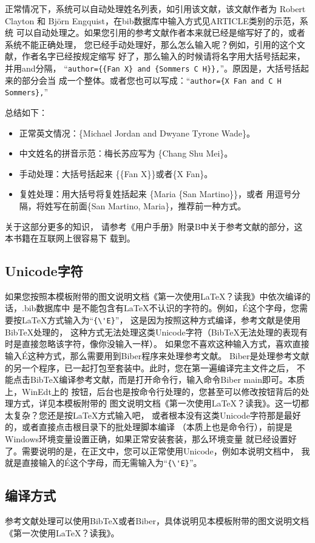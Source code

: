 正常情况下，系统可以自动处理姓名列表，如引用该文献，该文献作者为%
Robert Clayton 和 Bj\"orn Engquist，在bib数据库中输入方式见ARTICLE类别的示范，系统%
可以自动处理之。如果您引用的参考文献作者本来就已经是缩写好了的，或者系统不能正确处理，%
您已经手动处理好，那么怎么输入呢？例如，引用的这个文献，作者名字已经按规定缩写%
好了，那么输入的时候请将名字用大括号括起来，并用and分隔，%
“\verb"author={{Fan X} and {Sommers C H}},"”。原因是，大括号括起来的部分会当
成一个整体。或者您也可以写成：“\verb"author={X Fan and C H Sommers},"”

总结如下：
\begin{itemize}
\itemsep=0pt \parskip=0pt
  \item 正常英文情况：\{Michael Jordan and Dwyane Tyrone Wade\}。
  \item 中文姓名的拼音示范：梅长苏应写为 \{Chang Shu Mei\}。
  \item 手动处理：大括号括起来 \{\{Fan X\}\}或者\{X Fan\}。
  \item 复姓处理：用大括号将复姓括起来 \{Maria \{San Martino\}\}，或者%
    用逗号分隔，将姓写在前面\{San Martino, Maria\}，推荐前一种方式。
\end{itemize}

关于这部分更多的知识，%
请参考《\LaTeXe 用户手册》附录B中关于参考文献的部分，这本书籍在互联网上很容易下%
载到。

\subsection{Unicode字符}
如果您按照本模板附带的图文说明文档《第一次使用LaTeX？读我》中依次编译的话，.bib数据库中%
是不能包含有\LaTeX 不认识的字符的。例如，É这个字母，您需要按\LaTeX 方式输入为“\verb"{\'E}"”，%
这是因为按照这种方式编译，参考文献是使用BibTeX处理的，%
这种方式无法处理这类Unicode字符（BibTeX无法处理的表现有时是直接忽略该字符，像你没输入一样）。%
如果您不喜欢这种输入方式，喜欢直接输入É这种方式，那么需要用到Biber程序来处理参考文献。%
Biber是处理参考文献的另一个程序，已一起打包至\CTeX 套装中。此时，您在第一遍编译完主文件之后，%
不能点击BibTeX编译参考文献，而是打开命令行，输入命令Biber main即可。本质上，WinEdt上的%
按钮，后台也是按命令行处理的，您甚至可以修改按钮背后的处理方式，详见本模板附带的%
图文说明文档《第一次使用LaTeX？读我》。这一切都太复杂？您还是按\LaTeX 方式输入吧，%
或者根本没有这类Unicode字符那是最好的，或者直接点击根目录下的批处理脚本编译%
（本质上也是命令行），前提是Windows环境变量设置正确，如果正常安装\CTeX 套装，那么环境变量%
就已经设置好了。需要说明的是，在正文中，您可以正常使用Unicode，例如本说明文档中，%
我就是直接输入的É这个字母，而无需输入为“\verb"{\'E}"”。

\subsection{编译方式}
参考文献处理可以使用BibTeX或者Biber，具体说明见本模板附带的图文说明文档%
《第一次使用LaTeX？读我》。
